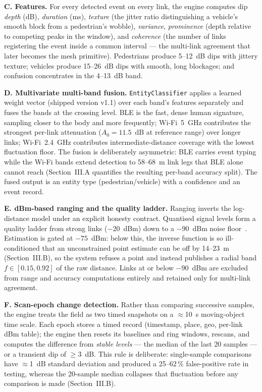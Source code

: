 \documentclass[journal,10pt]{IEEEtran}
\begin{document}
\textbf{C. Features.} For every detected event on every link, the engine
computes dip \emph{depth} (dB), \emph{duration} (ms), \emph{texture} (the
jitter ratio distinguishing a vehicle's smooth block from a pedestrian's
wobble), \emph{variance}, \emph{prominence} (depth relative to competing
peaks in the window), and \emph{coherence} (the number of links registering
the event inside a common interval --- the multi-link agreement that later
becomes the mesh primitive). Pedestrians produce 5--12~dB dips with jittery
texture; vehicles produce 15--26~dB dips with smooth, long blockages; and
confusion concentrates in the 4--13~dB band.

\textbf{D. Multivariate multi-band fusion.} \texttt{EntityClassifier}
applies a learned weight vector (shipped version v1.1) over each band's
features separately and fuses the bands at the crossing level. BLE is the
fast, dense human signature, sampling closer to the body and more
frequently; Wi-Fi~5~GHz contributes the strongest per-link attenuation
($A_0 = 11.5$~dB at reference range) over longer links; Wi-Fi~2.4~GHz
contributes intermediate-distance coverage with the lowest fluctuation
floor. The fusion is deliberately asymmetric: BLE carries event typing while
the Wi-Fi bands extend detection to 58--68~m link legs that BLE alone cannot
reach (Section~III.A quantifies the resulting per-band accuracy split). The
fused output is an entity type (pedestrian/vehicle) with a confidence and an
event record.

\textbf{E. dBm-based ranging and the quality ladder.} Ranging inverts the
log-distance model under an explicit honesty contract. Quantised signal
levels form a quality ladder from strong links ($-20$~dBm) down to a
$-90$~dBm noise floor~\cite{ramirez2021,milano2024,bai2020}. Estimation is
gated at $-75$~dBm: below this, the inverse function is so ill-conditioned
that an unconstrained point estimate can be off by 14--23~m (Section~III.B),
so the system refuses a point and instead publishes a radial band
$f \in [0.15, 0.92]$ of the raw distance. Links at or below $-90$~dBm are
excluded from range and accuracy computations entirely and retained only for
multi-link agreement.

\textbf{F. Scan-epoch change detection.} Rather than comparing successive
samples, the engine treats the field as two timed snapshots on a
$\approx$10~s moving-object time scale. Each epoch stores a timed record
(timestamp, place, geo, per-link dBm table); the engine then resets its
baselines and ring windows, rescans, and computes the difference from
\emph{stable levels} --- the median of the last 20 samples --- or a
transient dip of $\geq 3$~dB. This rule is deliberate: single-sample
comparisons have $\approx$1~dB standard deviation and produced a 25--62\,\%
false-positive rate in testing, whereas the 20-sample median collapses that
fluctuation before any comparison is made (Section~III.B).
\end{document}
